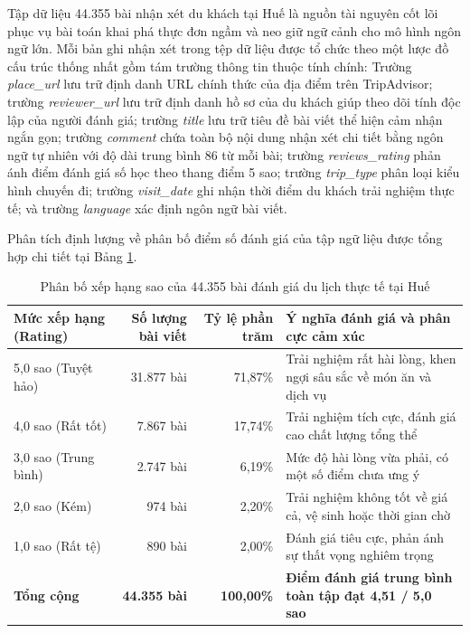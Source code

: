 Tập dữ liệu 44.355 bài nhận xét du khách tại Huế là nguồn tài nguyên cốt lõi phục vụ bài toán khai phá thực đơn ngầm và neo giữ ngữ cảnh cho mô hình ngôn ngữ lớn. Mỗi bản ghi nhận xét trong tệp dữ liệu được tổ chức theo một lược đồ cấu trúc thống nhất gồm tám trường thông tin thuộc tính chính:
Trường \textit{place\_url} lưu trữ định danh URL chính thức của địa điểm trên TripAdvisor; trường \textit{reviewer\_url} lưu trữ định danh hồ sơ của du khách giúp theo dõi tính độc lập của người đánh giá; trường \textit{title} lưu trữ tiêu đề bài viết thể hiện cảm nhận ngắn gọn; trường \textit{comment} chứa toàn bộ nội dung nhận xét chi tiết bằng ngôn ngữ tự nhiên với độ dài trung bình 86 từ mỗi bài; trường \textit{reviews\_rating} phản ánh điểm đánh giá số học theo thang điểm 5 sao; trường \textit{trip\_type} phân loại kiểu hình chuyến đi; trường \textit{visit\_date} ghi nhận thời điểm du khách trải nghiệm thực tế; và trường \textit{language} xác định ngôn ngữ bài viết.

Phân tích định lượng về phân bố điểm số đánh giá của tập ngữ liệu được tổng hợp chi tiết tại Bảng \ref{tab:rating-distribution}.

\begin{table}[htbp]
\centering
\caption{Phân bố xếp hạng sao của 44.355 bài đánh giá du lịch thực tế tại Huế}
\label{tab:rating-distribution}
\small
\begin{tabularx}{\textwidth}{l r r X}
\hline
\textbf{Mức xếp hạng (Rating)} & \textbf{Số lượng bài viết} & \textbf{Tỷ lệ phần trăm} & \textbf{Ý nghĩa đánh giá và phân cực cảm xúc} \\
\hline
5,0 sao (Tuyệt hảo) & 31.877 bài & 71,87\% & Trải nghiệm rất hài lòng, khen ngợi sâu sắc về món ăn và dịch vụ \\
4,0 sao (Rất tốt) & 7.867 bài & 17,74\% & Trải nghiệm tích cực, đánh giá cao chất lượng tổng thể \\
3,0 sao (Trung bình) & 2.747 bài & 6,19\% & Mức độ hài lòng vừa phải, có một số điểm chưa ưng ý \\
2,0 sao (Kém) & 974 bài & 2,20\% & Trải nghiệm không tốt về giá cả, vệ sinh hoặc thời gian chờ \\
1,0 sao (Rất tệ) & 890 bài & 2,00\% & Đánh giá tiêu cực, phản ánh sự thất vọng nghiêm trọng \\
\hline
\textbf{Tổng cộng} & \textbf{44.355 bài} & \textbf{100,00\%} & \textbf{Điểm đánh giá trung bình toàn tập đạt 4,51 / 5,0 sao} \\
\hline
\end{tabularx}
\end{table}

